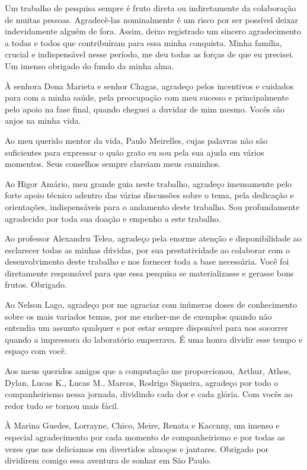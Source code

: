 Um trabalho de pesquisa sempre é fruto direta ou indiretamente da colaboração de
muitas pessoas. Agradecê-las nominalmente é um risco por ser possível deixar
indevidamente alguém de fora. Assim, deixo registrado um sincero agradecimento a
todas e todos que contribuíram para essa minha conquista. Minha família, crucial
e indispensável nesse período, me deu todas as forças de que eu precisei. Um
imenso obrigado do fundo da minha alma.

À senhora Dona Marieta e senhor Chagas, agradeço pelos incentivos e cuidados
para com a minha saúde, pela preocupação com meu sucesso e principalmente pelo
apoio na fase final, quando cheguei a duvidar de mim mesmo. Vocês são anjos na
minha vida. 

Ao meu querido mentor da vida, Paulo Meirelles, cujas palavras não são
suficientes para expressar o quão grato eu sou pela sua ajuda em vários
momentos. Seus conselhos sempre clareiam meus caminhos.

Ao Higor Amário, meu grande guia neste trabalho, agradeço imensamente pelo forte
apoio técnico adentro das várias discussões sobre o tema, pela dedicação e
orientações, indispensáveis para o andamento deste trabalho. Sou profundamente
agradecido por toda sua doação e empenho a este trabalho.

Ao professor Alexandru Telea, agradeço pela enorme atenção e disponibilidade ao
esclarecer todas as minhas dúvidas, por sua prestatividade ao colaborar com o
desenvolvimento deste trabalho e nos fornecer toda a base necessária. Você foi
diretamente responsável para que essa pesquisa se materializasse e gerasse bons
frutos. Obrigado.

Ao Nelson Lago, agradeço por me agraciar com inúmeras doses de conhecimento
sobre os mais variados temas, por me encher-me de exemplos quando não entendia
um assunto qualquer e por estar sempre disponível para nos socorrer quando a
impressora do laboratório emperrava. É uma honra dividir esse tempo e espaço com
você.

Aos meus queridos amigos que a computação me proporcionou, Arthur, Athos, Dylan,
Lucas K., Lucas M., Marcos, Rodrigo Siqueira, agradeço por todo o companheirismo
nessa jornada, dividindo cada dor e cada glória. Com vocês ao redor tudo se
tornou mais fácil.

À Marina Guedes, Lorrayne, Chico, Meire, Renata e Kaccnny, um imenso e especial
agradecimento por cada momento de companheirismo e por todas as vezes que
nos deliciamos em divertidos almoços e jantares. Obrigado por
dividirem comigo essa aventura de sonhar em São Paulo.

